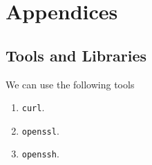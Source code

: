 \documentclass[a4paper, 12pt]{book} %
\begin{document}






\chapter{Appendices}


\section{Tools and Libraries}
We can use the following tools
\begin{enumerate}
    \item \verb|curl|.
    \item \verb|openssl|.
    \item \verb|openssh|.
\end{enumerate}
\end{document}
